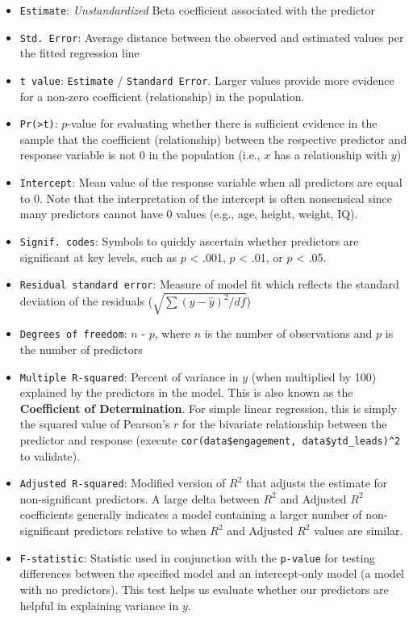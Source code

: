 \documentclass[
]{book}
\providecommand{\tightlist}{%
  \setlength{\itemsep}{0pt}\setlength{\parskip}{0pt}}
\begin{document}
\begin{itemize}
\tightlist
\item
  \texttt{Estimate}: \emph{Unstandardized} Beta coefficient associated with the predictor
\item
  \texttt{Std.\ Error}: Average distance between the observed and estimated values per the fitted regression line
\item
  \texttt{t\ value}: \texttt{Estimate} / \texttt{Standard\ Error}. Larger values provide more evidence for a non-zero coefficient (relationship) in the population.
\item
  \texttt{Pr(\textgreater{}\textbar{}t\textbar{})}: \(p\)-value for evaluating whether there is sufficient evidence in the sample that the coefficient (relationship) between the respective predictor and response variable is not 0 in the population (i.e., \(x\) has a relationship with \(y\))
\item
  \texttt{Intercept}: Mean value of the response variable when all predictors are equal to 0. Note that the interpretation of the intercept is often nonsensical since many predictors cannot have 0 values (e.g., age, height, weight, IQ).
\item
  \texttt{Signif.\ codes}: Symbols to quickly ascertain whether predictors are significant at key levels, such as \(p\) \textless{} .001, \(p\) \textless{} .01, or \(p\) \textless{} .05.
\item
  \texttt{Residual\ standard\ error}: Measure of model fit which reflects the standard deviation of the residuals (\(\sqrt {\sum(y-\hat{y})^2 / df}\))
\item
  \texttt{Degrees\ of\ freedom}: \(n\) - \(p\), where \(n\) is the number of observations and \(p\) is the number of predictors
\item
  \texttt{Multiple\ R-squared}: Percent of variance in \(y\) (when multiplied by 100) explained by the predictors in the model. This is also known as the \textbf{Coefficient of Determination}. For simple linear regression, this is simply the squared value of Pearson's \(r\) for the bivariate relationship between the predictor and response (execute \texttt{cor(data\$engagement,\ data\$ytd\_leads)\^{}2} to validate).
\item
  \texttt{Adjusted\ R-squared}: Modified version of \(R^2\) that adjusts the estimate for non-significant predictors. A large delta between \(R^2\) and Adjusted \(R^2\) coefficients generally indicates a model containing a larger number of non-significant predictors relative to when \(R^2\) and Adjusted \(R^2\) values are similar.
\item
  \texttt{F-statistic}: Statistic used in conjunction with the \texttt{p-value} for testing differences between the specified model and an intercept-only model (a model with no predictors). This test helps us evaluate whether our predictors are helpful in explaining variance in \(y\).
\end{itemize}
\end{document}
